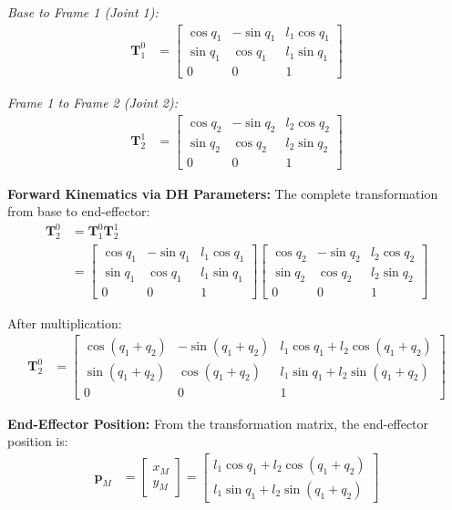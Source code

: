 \documentclass[11pt,a4paper]{article}
\begin{document}
\textit{Base to Frame 1 (Joint 1):}
\begin{align}
\bm{T}_1^0 &= \begin{bmatrix}
\cos q_1 & -\sin q_1 & l_1\cos q_1 \\
\sin q_1 & \cos q_1 & l_1\sin q_1 \\
0 & 0 & 1
\end{bmatrix}
\end{align}

\textit{Frame 1 to Frame 2 (Joint 2):}
\begin{align}
\bm{T}_2^1 &= \begin{bmatrix}
\cos q_2 & -\sin q_2 & l_2\cos q_2 \\
\sin q_2 & \cos q_2 & l_2\sin q_2 \\
0 & 0 & 1
\end{bmatrix}
\end{align}

\textbf{Forward Kinematics via DH Parameters:}
The complete transformation from base to end-effector:
\begin{align}
\bm{T}_2^0 &= \bm{T}_1^0 \bm{T}_2^1 \\
&= \begin{bmatrix}
\cos q_1 & -\sin q_1 & l_1\cos q_1 \\
\sin q_1 & \cos q_1 & l_1\sin q_1 \\
0 & 0 & 1
\end{bmatrix}
\begin{bmatrix}
\cos q_2 & -\sin q_2 & l_2\cos q_2 \\
\sin q_2 & \cos q_2 & l_2\sin q_2 \\
0 & 0 & 1
\end{bmatrix}
\end{align}

After multiplication:
\begin{align}
\bm{T}_2^0 &= \begin{bmatrix}
\cos(q_1+q_2) & -\sin(q_1+q_2) & l_1\cos q_1 + l_2\cos(q_1+q_2) \\
\sin(q_1+q_2) & \cos(q_1+q_2) & l_1\sin q_1 + l_2\sin(q_1+q_2) \\
0 & 0 & 1
\end{bmatrix}
\end{align}

\textbf{End-Effector Position:}
From the transformation matrix, the end-effector position is:
\begin{align}
\bm{p}_M &= \begin{bmatrix} x_M \\ y_M \end{bmatrix} = \begin{bmatrix}
l_1\cos q_1 + l_2\cos(q_1+q_2) \\
l_1\sin q_1 + l_2\sin(q_1+q_2)
\end{bmatrix}
\end{align}
\end{document}
